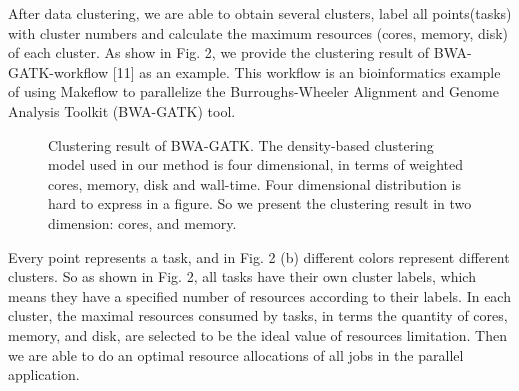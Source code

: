 \documentclass[conference]{IEEEtran}
\begin{document}
After data clustering, we are able to obtain several clusters, label all points(tasks) with cluster numbers and calculate the maximum resources (cores, memory, disk) of each cluster. As show in Fig. 2, we provide the clustering result of BWA-GATK-workflow [11] as an example. This workflow is an bioinformatics example of using Makeflow to parallelize the Burroughs-Wheeler Alignment and Genome Analysis Toolkit (BWA-GATK) tool.

\begin{figure}[htbp]
  \centering 
  \caption{Clustering result of BWA-GATK. The density-based clustering model used in our method is four dimensional, in terms of weighted cores, memory, disk and wall-time. Four dimensional distribution is hard to express in a figure. So we present the clustering result in two dimension: cores, and memory.} 
\end{figure}

Every point represents a task, and in Fig. 2 (b) different colors represent different clusters. So as shown in Fig. 2, all tasks have their own cluster labels, which means they have a specified number of resources according to their labels. In each cluster, the maximal resources consumed by tasks, in terms the quantity of cores, memory, and disk, are selected to be the ideal value of resources limitation. Then we are able to do an optimal resource allocations of all jobs in the parallel application.
\end{document}
